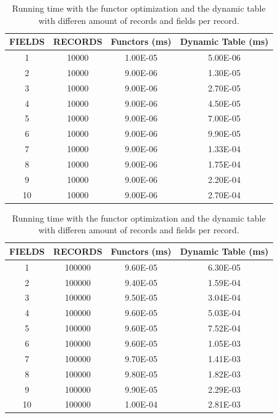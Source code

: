 \begin{table}	
	\caption{Running time with the functor optimization and the dynamic table with differen amount of records and fields per record.}
	\begin{tabular}{|c|c|c|c|}
		\hline
		\textbf{FIELDS}& \textbf{RECORDS}& \textbf{Functors (ms)}&\textbf{Dynamic Table (ms)}\\ \hline
		1&	10000&	1.00E-05&	5.00E-06\\ \hline
		2&	10000&	9.00E-06&	1.30E-05\\ \hline
		3&	10000&	9.00E-06&	2.70E-05\\ \hline
		4&	10000&	9.00E-06&	4.50E-05\\ \hline
		5&	10000&	9.00E-06&	7.00E-05\\ \hline
		6&	10000&	9.00E-06&	9.90E-05\\ \hline
		7&	10000&	9.00E-06&	1.33E-04\\ \hline
		8&	10000&	9.00E-06&	1.75E-04\\ \hline
		9&	10000&	9.00E-06&	2.20E-04\\ \hline
		10&	10000&	9.00E-06&	2.70E-04\\ \hline			
	\end{tabular}

	\vspace{0.15cm}
	\begin{tabular}{|c|c|c|c|}
		\hline
		\textbf{FIELDS}& \textbf{RECORDS}& \textbf{Functors (ms)}&\textbf{Dynamic Table (ms)}\\ \hline
		1&	100000&	9.60E-05&	6.30E-05\\ \hline
		2&	100000&	9.40E-05&	1.59E-04\\ \hline
		3&	100000&	9.50E-05&	3.04E-04\\ \hline
		4&	100000&	9.60E-05&	5.03E-04\\ \hline
		5&	100000&	9.60E-05&	7.52E-04\\ \hline
		6&	100000&	9.60E-05&	1.05E-03\\ \hline
		7&	100000&	9.70E-05&	1.41E-03\\ \hline
		8&	100000&	9.80E-05&	1.82E-03\\ \hline
		9&	100000&	9.90E-05&	2.29E-03\\ \hline
		10&	100000&	1.00E-04&	2.81E-03\\ \hline				
	\end{tabular}


\end{table}
